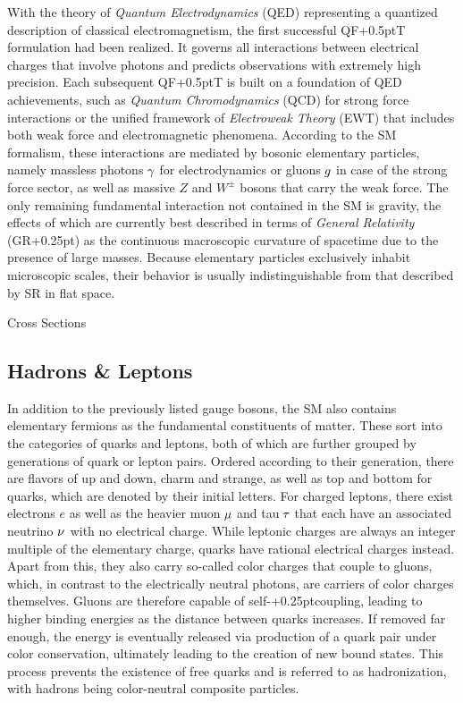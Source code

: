 With the theory of \emph{Quantum Electrodynamics} (QED) representing a quantized description of classical electromagnetism, the
first successful QF{\kern+0.5pt}T formulation had been realized. It governs all interactions between electrical charges that involve
photons and predicts observations with extremely high precision. Each subsequent QF{\kern+0.5pt}T is built on a foundation of QED
achievements, such as \emph{Quantum Chromodynamics} (QCD) for strong force interactions or the unified framework of
\emph{Electroweak Theory} (EWT) that includes both weak force and electromagnetic phenomena. According to the SM formalism, these
interactions are mediated by bosonic elementary particles, namely massless photons $\kern-0.5pt \gamma$ for electrodynamics or
gluons $\kern-0.5pt g$ in case of the strong force sector, as well as massive $Z$ and $W^\pm$ bosons that carry the weak force. 
The only remaining fundamental interaction not contained in the SM is gravity, the effects of which are currently best described
in terms of \emph{General Relativity} (GR{\kern+0.25pt}) as the continuous macroscopic curvature of spacetime due to the presence
of large masses. Because elementary particles exclusively inhabit microscopic scales, their behavior is usually indistinguishable
from that described by SR in flat space.

Cross Sections



\subsection{Hadrons \& Leptons}
\label{sub:hadrons}

In addition to the previously listed gauge bosons, the SM also contains elementary fermions as the fundamental constituents of
matter. These sort into the categories of quarks and leptons, both of which are further grouped by generations of quark or lepton
pairs. Ordered according to their generation, there are flavors of up and down, charm and strange, as well as top and bottom for
quarks, which are denoted by their initial letters. For charged leptons, there exist electrons $e$ as well as the heavier muon
$\kern-0.5pt \mu$ and tau $\kern-1.0pt \tau$ that each have an associated neutrino $\nu \kern+0.5pt$ with no electrical charge.
While leptonic charges are always an integer multiple of the elementary charge, quarks have rational electrical charges instead. 
Apart from this, they also carry so-called color charges that couple to gluons, which, in contrast to the electrically neutral
photons, are carriers of color charges themselves. Gluons are therefore capable of self-{\kern+0.25pt}coupling, leading to
higher binding energies as the distance between quarks increases. If removed far enough, the energy is eventually released via
production of a quark pair under color conservation, ultimately leading to the creation of new bound states. This process prevents
the existence of free quarks and is referred to as hadronization, with hadrons being color-neutral composite particles.

